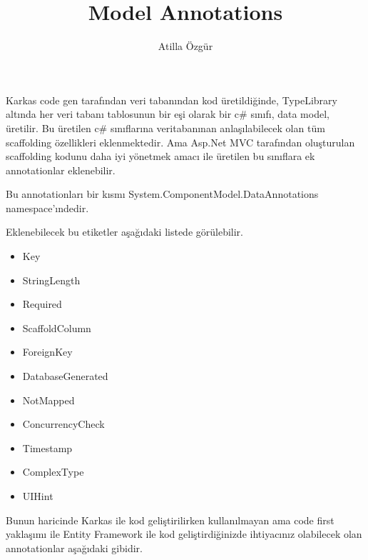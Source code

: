 \documentclass[10pt,a4paper]{article}
\newcommand{\authorName}{Atilla \"Ozg\"ur}
\newcommand{\titleName}{Model Annotations}
\begin{document}
\author{\authorName}
\title{\titleName}



\maketitle



Karkas code gen tarafından veri tabanından kod üretildiğinde,
TypeLibrary altında her veri tabanı tablosunun bir eşi olarak
bir c\# sınıfı, data model, üretilir. 
Bu üretilen c\# sınıflarına veritabanınan anlaşılabilecek olan
tüm scaffolding özellikleri eklenmektedir.
Ama Asp.Net MVC tarafından oluşturulan scaffolding kodunu
daha iyi yönetmek amacı ile üretilen
bu sınıflara ek annotationlar eklenebilir.

Bu annotationları bir kısmı System.ComponentModel.DataAnnotations namespace'ındedir.



Eklenebilecek bu etiketler aşağıdaki listede \cite{Litwin2012AMV12:} görülebilir.



\begin{itemize}

\item  Key

\item  StringLength

\item  Required

\item ScaffoldColumn


\item ForeignKey

\item DatabaseGenerated

\item  NotMapped


\item  ConcurrencyCheck


\item  Timestamp

\item  ComplexType

\item  UIHint

\end{itemize}

Bunun haricinde Karkas ile kod geliştirilirken kullanılmayan
ama code first yaklaşımı ile Entity Framework ile kod
geliştirdiğinizde ihtiyacınız olabilecek olan
annotationlar aşağıdaki gibidir.
\end{document}
